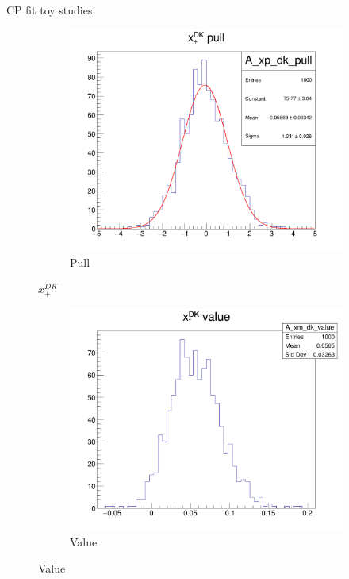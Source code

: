 \documentclass{beamer}
\begin{document}
\begin{frame}{CP fit toy studies}
\begin{figure}
    \begin{subfigure}{0.25\textwidth}
      \includegraphics[width = 1.0\textwidth]{Plots/A_xp_dk_pull.png}
      \caption{Pull}
    \end{subfigure}
    \caption{$x_+^{DK}$}
  \end{figure}
  \begin{figure}
    \centering
    \vspace{-0.15cm}
    \begin{subfigure}{0.25\textwidth}
      \includegraphics[width = 1.0\textwidth]{Plots/A_xm_dk_value.png}
      \caption{Value}

\end{subfigure}
\end{figure}
\end{frame}
\end{document}
